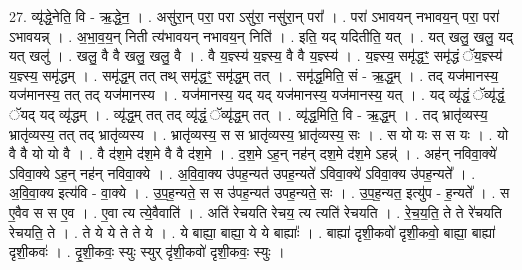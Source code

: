 \documentclass[17pt]{extarticle}
\begin{document}
27. व्यृ॑द्धे॒नेति॒ वि - ऋ॒द्धे॒न॒ । . असु॑रा॒न् परा॒ परा ऽसु॑रा॒ नसु॑रा॒न् परा᳚ । . परा॑ ऽभावयन् नभावय॒न् परा॒ परा॑ ऽभावयन्न् । . अ॒भा॒व॒य॒न् निती त्य॑भावयन् नभावय॒न् निति॑ । . इति॒ यद् यदितीति॒ यत् । . यत् खलु॒ खलु॒ यद् यत् खलु॑ । . खलु॒ वै वै खलु॒ खलु॒ वै । . वै य॒ज्ञ्स्य॑ य॒ज्ञ्स्य॒ वै वै य॒ज्ञ्स्य॑ । . य॒ज्ञ्स्य॒ समृ॑द्धꣳ॒॒ समृ॑द्धं ॅय॒ज्ञ्स्य॑ य॒ज्ञ्स्य॒ समृ॑द्धम् । . समृ॑द्ध॒म् तत् तथ् समृ॑द्धꣳ॒॒ समृ॑द्ध॒म् तत् । . समृ॑द्ध॒मिति॒ सं - ऋ॒द्ध॒म् । . तद् यज॑मानस्य॒ यज॑मानस्य॒ तत् तद् यज॑मानस्य । . यज॑मानस्य॒ यद् यद् यज॑मानस्य॒ यज॑मानस्य॒ यत् । . यद् व्यृ॑द्धं॒ ॅव्यृ॑द्धं॒ ॅयद् यद् व्यृ॑द्धम् । . व्यृ॑द्ध॒म् तत् तद् व्यृ॑द्धं॒ ॅव्यृ॑द्ध॒म् तत् । . व्यृ॑द्ध॒मिति॒ वि - ऋ॒द्ध॒म् । . तद् भ्रातृ॑व्यस्य॒ भ्रातृ॑व्यस्य॒ तत् तद् भ्रातृ॑व्यस्य । . भ्रातृ॑व्यस्य॒ स स भ्रातृ॑व्यस्य॒ भ्रातृ॑व्यस्य॒ सः । . स यो यः स स यः । . यो वै वै यो यो वै । . वै द॑श॒मे द॑श॒मे वै वै द॑श॒मे । . द॒श॒मे ऽह॒न् नह॑न् दश॒मे द॑श॒मे ऽहन्न्॑ । . अह॑न् नविवा॒क्ये॑ ऽविवा॒क्ये ऽह॒न् नह॑न् नविवा॒क्ये । . अ॒वि॒वा॒क्य उ॑पह॒न्यत॑ उपह॒न्यते॑ ऽविवा॒क्ये॑ ऽविवा॒क्य उ॑पह॒न्यते᳚ । . अ॒वि॒वा॒क्य इत्य॑वि - वा॒क्ये । . उ॒प॒ह॒न्यते॒ स स उ॑पह॒न्यत॑ उपह॒न्यते॒ सः । . उ॒प॒ह॒न्यत॒ इत्यु॑प - ह॒न्यते᳚ । . स ए॒वैव स स ए॒व । . ए॒वा त्य त्ये॒वैवाति॑ । . अति॑ रेचयति रेचय॒ त्य त्यति॑ रेचयति । . रे॒च॒य॒ति॒ ते ते रे॑चयति रेचयति॒ ते । . ते ये ये ते ते ये । . ये बाह्या॒ बाह्या॒ ये ये बाह्याः᳚ । . बाह्या॑ दृशी॒कवो॑ दृशी॒कवो॒ बाह्या॒ बाह्या॑ दृशी॒कवः॑ । . दृ॒शी॒कवः॒ स्युः स्युर् दृ॑शी॒कवो॑ दृशी॒कवः॒ स्युः । \newline
\end{document}
